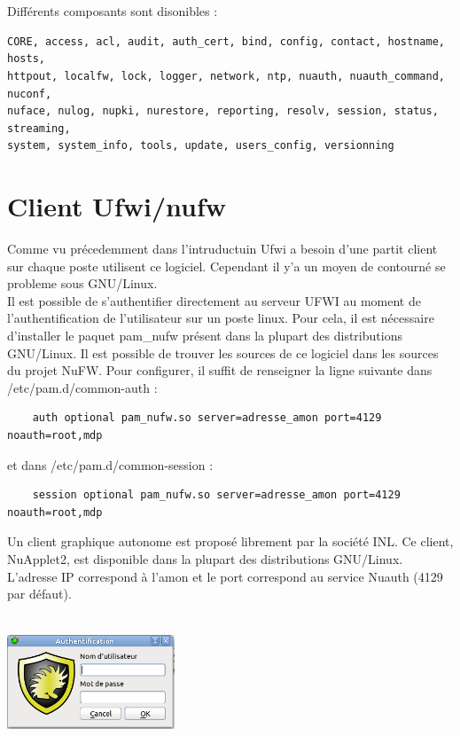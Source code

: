 \documentclass[12pt]{report}
\begin{document}
\begin{itemize}
\begin{itemize}
\end{itemize}
\\
\\
Différents composants sont disonibles :
\begin{verbatim}
CORE, access, acl, audit, auth_cert, bind, config, contact, hostname, hosts, 
httpout, localfw, lock, logger, network, ntp, nuauth, nuauth_command, nuconf, 
nuface, nulog, nupki, nurestore, reporting, resolv, session, status, streaming, 
system, system_info, tools, update, users_config, versionning
\end{verbatim}


\chapter{Client Ufwi/nufw}
Comme vu précedemment dans l'intruductuin Ufwi a besoin d'une partit client sur chaque poste utilisent ce logiciel. Cependant il y'a un moyen de contourné se probleme sous 
GNU/Linux.\\ Il est possible de s'authentifier directement au serveur UFWI au moment de l'authentification de l'utilisateur sur un poste linux.
Pour cela, il est nécessaire d'installer le paquet pam\_nufw présent dans la plupart des distributions GNU/Linux. Il est possible de trouver les sources de ce logiciel dans les sources du projet NuFW.
Pour configurer, il suffit de renseigner la ligne suivante dans /etc/pam.d/common-auth :
\begin{verbatim}
	auth optional pam_nufw.so server=adresse_amon port=4129 noauth=root,mdp
\end{verbatim}
et dans /etc/pam.d/common-session :
\begin{verbatim}
	session optional pam_nufw.so server=adresse_amon port=4129 noauth=root,mdp
\end{verbatim}
Un client graphique autonome est proposé librement par la société INL. Ce client, NuApplet2, est disponible dans la plupart des distributions GNU/Linux.
L'adresse IP correspond à l'amon et le port correspond au service Nuauth (4129 par défaut).\newligne
\vspace{1,5cm}
\begin{center}
  \includegraphics[width=5cm,height=4cm]{images/nuapp.png}

\end{center}
\end{itemize}
\end{document}
